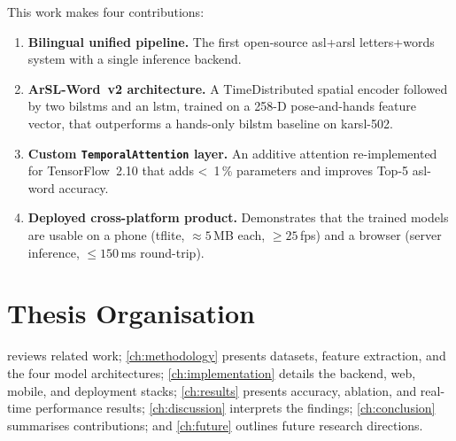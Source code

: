 This work makes four contributions:

\begin{enumerate}
  \item[\textbf{C-1}] \textbf{Bilingual unified pipeline.} The first
        open-source \gls{asl}+\gls{arsl} letters+words system with a single
        inference backend.
  \item[\textbf{C-2}] \textbf{ArSL-Word~v2 architecture.} A TimeDistributed
        spatial encoder followed by two \gls{bilstm}s and an \gls{lstm},
        trained on a 258-D pose-and-hands feature vector, that outperforms
        a hands-only \gls{bilstm} baseline on \gls{karsl}-502.
  \item[\textbf{C-3}] \textbf{Custom \texttt{TemporalAttention} layer.} An
        additive attention re-implemented for TensorFlow~2.10 that adds
        \textless~1\,\% parameters and improves Top-5 \gls{asl}-word
        accuracy.
  \item[\textbf{C-4}] \textbf{Deployed cross-platform product.}
        Demonstrates that the trained models are usable on a phone
        (\gls{tflite}, $\approx 5$\,MB each, $\geq 25$\,\gls{fps}) and a
        browser (server inference, $\leq 150$\,ms round-trip).
\end{enumerate}

\section{Thesis Organisation}
\label{sec:intro:organisation}

 reviews related work; \cref{ch:methodology} presents
datasets, feature extraction, and the four model architectures;
\cref{ch:implementation} details the backend, web, mobile, and
deployment stacks; \cref{ch:results} presents accuracy, ablation, and
real-time performance results; \cref{ch:discussion} interprets the
findings; \cref{ch:conclusion} summarises contributions; and
\cref{ch:future} outlines future research directions.
